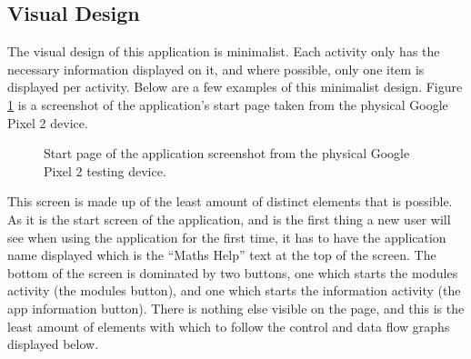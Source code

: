 \documentclass{article}
\begin{document}
\subsection{Visual Design}

The visual design of this application is minimalist. Each activity only has the necessary information displayed on it, and where possible, only one item is displayed per activity. Below are a few examples of this minimalist design. Figure \ref{figure:applicationStartPage} is a screenshot of the application's start page taken from the physical Google Pixel 2 device.

\begin{figure}[H]
	\centering
	\caption{Start page of the application screenshot from the physical Google Pixel 2 testing device.}
	\label{figure:applicationStartPage}
\end{figure}

This screen is made up of the least amount of distinct elements that is possible. As it is the start screen of the application, and is the first thing a new user will see when using the application for the first time, it has to have the application name displayed which is the ``Maths Help'' text at the top of the screen. The bottom of the screen is dominated by two buttons, one which starts the modules activity (the modules button), and one which starts the information activity (the app information button). There is nothing else visible on the page, and this is the least amount of elements with which to follow the control and data flow graphs displayed below. \par
\end{document}

